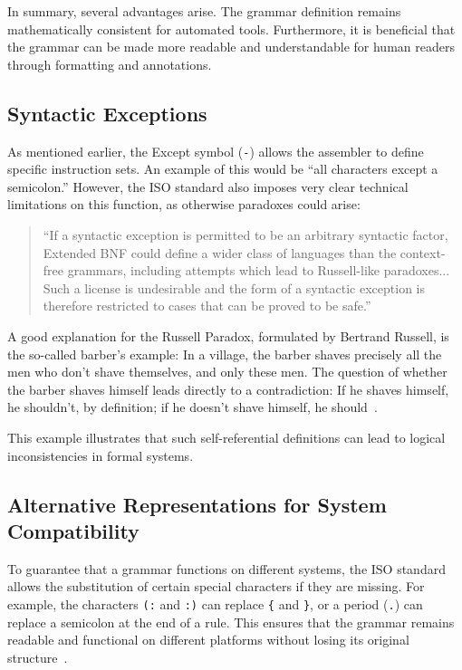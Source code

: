 In summary, several advantages arise. The grammar definition remains mathematically consistent for automated tools. Furthermore, it is beneficial that the grammar can be made more readable and understandable for human readers through formatting and annotations.

\subsection{Syntactic Exceptions}

As mentioned earlier, the Except symbol (\texttt{-}) allows the assembler to define specific instruction sets. An example of this would be ``all characters except a semicolon.'' However, the ISO standard also imposes very clear technical limitations on this function, as otherwise paradoxes could arise:

\begin{quote}
``If a syntactic exception is permitted to be an arbitrary syntactic factor, Extended BNF could define a wider class of languages than the context-free grammars, including attempts which lead to Russell-like paradoxes... Such a license is undesirable and the form of a syntactic exception is therefore restricted to cases that can be proved to be safe.''~\cite[p.~2]{ISO/IEC149771996InformationBNF}
\end{quote}

A good explanation for the Russell Paradox, formulated by Bertrand Russell, is the so-called barber's example: In a village, the barber shaves precisely all the men who don't shave themselves, and only these men. The question of whether the barber shaves himself leads directly to a contradiction: If he shaves himself, he shouldn't, by definition; if he doesn't shave himself, he should~\cite{WikipediaBarbierParadoxon}.

This example illustrates that such self-referential definitions can lead to logical inconsistencies in formal systems.


\subsection{Alternative Representations for System Compatibility}

To guarantee that a grammar functions on different systems, the ISO standard allows the substitution of certain special characters if they are missing. For example, the characters \texttt{(:} and \texttt{:)} can replace \texttt{\{} and \texttt{\}}, or a period (\texttt{.}) can replace a semicolon at the end of a rule. This ensures that the grammar remains readable and functional on different platforms without losing its original structure~\cite[p.~5]{ISO/IEC149771996InformationBNF}.

